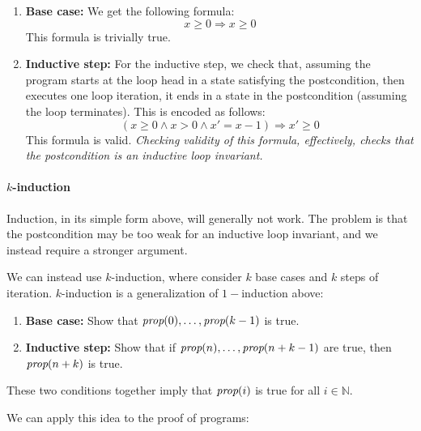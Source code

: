 \documentclass{amsart}
\theoremstyle{definition}
\theoremstyle{remark}
\numberwithin{equation}{section}
\begin{document}
\begin{enumerate}
  \item \textbf{Base case:}
  We get the following
  formula:
  $$x \geq 0 \Rightarrow x \geq 0$$
  This formula is trivially true.

  \item \textbf{Inductive step:}
  For the inductive step, we check that,
  assuming the program starts at the loop head
  in a state satisfying the postcondition,
  then executes one loop iteration,
  it ends in a state in the postcondition (assuming the loop terminates).
  This is encoded as follows:
  $$(x \geq 0 \land x > 0 \land x' = x - 1) \Rightarrow x' \geq 0$$
  This formula is valid.
  \emph{Checking validity of this formula, effectively, checks that
  the postcondition is an inductive loop invariant.}
\end{enumerate}

\paragraph{$k$-induction}
%
Induction, in its simple form above, will generally
not work.
The problem is that the postcondition may be too weak
for an inductive loop invariant, and we instead
require a stronger argument.

We can instead use $k$-induction, where consider
$k$ base cases and $k$ steps of iteration.
$k$-induction is a generalization of $1-$induction
above:

\begin{enumerate}
  \item \textbf{Base case:}
  Show that $\emph{prop}(0),\ldots,\emph{prop}(k-1)$ is true.

  \item \textbf{Inductive step:}
  Show that if $\emph{prop}(n),\ldots,\emph{prop}(n+k-1)$
  are true, then $\emph{prop}(n+k)$ is true.
\end{enumerate}
These two conditions together imply that
$\emph{prop}(i)$ is true for all $i \in \mathbb{N}$.

We can apply this idea to the proof of programs:
\end{document}
